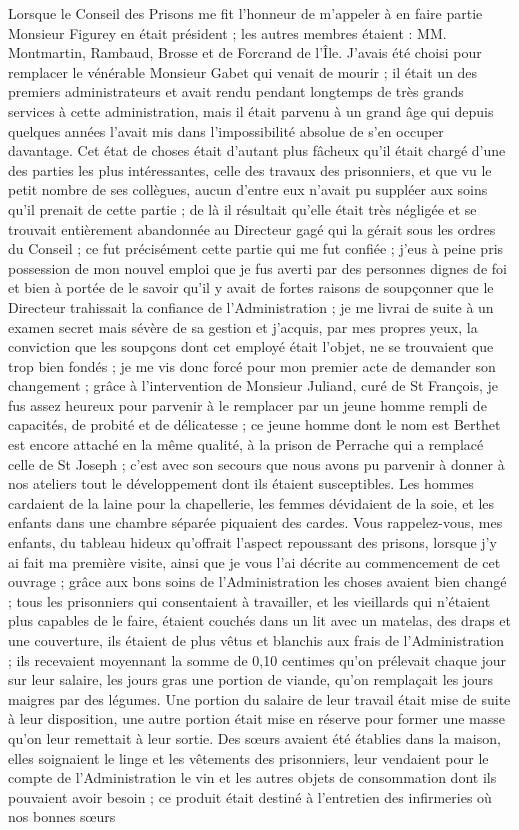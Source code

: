 \documentclass[11pt,a4paper]{report}
\begin{document}
Lorsque le Conseil des Prisons me fit l'honneur de m'appeler à en faire partie Monsieur Figurey en était président ; les autres membres étaient : MM. Montmartin, Rambaud, Brosse et de Forcrand de l'Île. J'avais été choisi pour remplacer le vénérable Monsieur Gabet qui venait de mourir ; il était un des premiers administrateurs et avait rendu pendant longtemps de très grands services à cette administration, mais il était parvenu à un grand âge qui depuis quelques années l'avait mis dans l'impossibilité absolue de s'en occuper davantage. Cet état de choses était d'autant plus fâcheux qu'il était chargé d'une des parties les plus intéressantes, celle des travaux des prisonniers, et que vu le petit nombre de ses collègues, aucun d'entre eux n'avait pu suppléer aux soins qu'il prenait de cette partie ; de là il résultait qu'elle était très négligée et se trouvait entièrement abandonnée au Directeur gagé qui la gérait sous les ordres du Conseil ; ce fut précisément cette partie qui me fut confiée ; j'eus à peine pris possession de mon nouvel emploi que je fus averti par des personnes dignes de foi et bien à portée de le savoir qu'il y avait de fortes raisons de soupçonner que le Directeur trahissait la confiance de l'Administration ; je me livrai de suite à un examen secret mais sévère de sa gestion et j'acquis, par mes propres yeux, la conviction que les soupçons dont cet employé était l'objet, ne se trouvaient que trop bien fondés ; je me vis donc forcé pour mon premier acte de demander son changement ; grâce à l'intervention de Monsieur Juliand, curé de St François, je fus assez heureux pour parvenir à le remplacer par un jeune homme rempli de capacités, de probité et de délicatesse ; ce jeune homme dont le nom est Berthet est encore attaché en la même qualité, à la prison de Perrache qui a remplacé celle de St Joseph ; c'est avec son secours que nous avons pu parvenir à donner à nos ateliers tout le développement dont ils étaient susceptibles. Les hommes cardaient de la laine pour la chapellerie, les femmes dévidaient de la soie, et les enfants dans une chambre séparée piquaient des cardes. Vous rappelez-vous, mes enfants, du tableau hideux qu'offrait l'aspect repoussant des prisons, lorsque j'y ai fait ma première visite, ainsi que je vous l'ai décrite au commencement de cet ouvrage ; grâce aux bons soins de l'Administration les choses avaient bien changé ; tous les prisonniers qui consentaient à travailler, et les vieillards qui n'étaient plus capables de le faire, étaient couchés dans un lit avec un matelas, des draps et une couverture, ils étaient de plus vêtus et blanchis aux frais de l'Administration ; ils recevaient moyennant la somme de 0,10 centimes qu'on prélevait chaque jour sur leur salaire, les jours gras une portion de viande, qu'on remplaçait les jours maigres par des légumes. Une portion du salaire de leur travail était mise de suite à leur disposition, une autre portion était mise en réserve pour former une masse qu'on leur remettait à leur sortie. Des sœurs avaient été établies dans la maison, elles soignaient le linge et les vêtements des prisonniers, leur vendaient pour le compte de l'Administration le vin et les autres objets de consommation dont ils pouvaient avoir besoin ; ce produit était destiné à l'entretien des infirmeries où nos bonnes sœurs 
\end{document}
